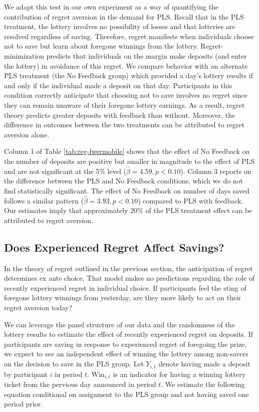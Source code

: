 \documentclass[11pt]{article}
\begin{document}
		We adapt this test in our own experiment as a way of quantifying the contribution of regret aversion in the demand for PLS. Recall that in the PLS treatment, the lottery involves no possibility of losses and that lotteries are resolved regardless of saving. Therefore, regret manifests when individuals choose not to save but learn about foregone winnings from the lottery. Regret-minimization predicts that individuals on the margin make deposits (and enter the lottery) in avoidance of this regret. We compare behavior with an alternate PLS treatment (the No Feedback group) which provided a day's lottery results if and only if the individual made a deposit on that day. Participants in this condition correctly anticipate that choosing not to save involves no regret since they can remain unaware of their foregone lottery earnings. As a result, regret theory predicts greater deposits with feedback than without. Moreover, the difference in outcomes between the two treatments can be attributed to regret aversion alone. 

		Column 1 of Table \ref{tab:reg-fwermobile} shows that the effect of No Feedback on the number of deposits are positive but smaller in magnitude to the effect of PLS and are not significant at the 5\% level ($\hat \beta = 4.59, p < 0.10$). Column 3 reports on the difference between the PLS and No Feedback conditions, which we do not find statistically significant. The effect of No Feedback on number of days saved follows a similar pattern ($\hat \beta = 3.93, p < 0.10$) compared to PLS with feedback. Our estimates imply that approximately 20\% of the PLS treatment effect can be attributed to regret aversion.

	\subsection{Does Experienced Regret Affect Savings?}


		In the theory of regret outlined in the previous section, the anticipation of regret determines ex ante choice. That model makes no predictions regarding the role of recently experienced regret in individual choice. If participants feel the sting of foregone lottery winnings from yesterday, are they more likely to act on their regret aversion today?

		We can leverage the panel structure of our data and the randomness of the lottery results to estimate the effect of recently experienced regret on deposits. If participants are saving in response to experienced regret of foregoing the prize, we expect to see an independent effect of winning the lottery among non-savers on the decision to save in the PLS group. Let $Y_{i,t}$ denote having made a deposit by participant $i$ in period $t$. $\text{Win}_{i,t}$ is an indicator for having a winning lottery ticket from the pervious day announced in period $t$. We estimate the following equation conditional on assignment to the PLS group and not having saved one period prior.
\end{document}
